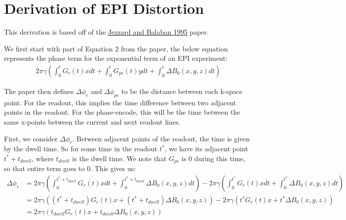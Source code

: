 \documentclass{article}
\begin{document}
\section*{Derivation of EPI Distortion}
This derivation is based off of the \href{https://pubmed.ncbi.nlm.nih.gov/7674900/}{Jezzard and Balaban 1995} paper.

We first start with part of Equation 2 from the paper, the below equation represents the phase term for the exponential
term of an EPI experiment:
\begin{align*}
    2\pi\gamma\left(\int_{0}^{t}G_r(t)x dt + \int_{0}^{t}G_{pe}(t)y dt + \int_{0}^{t}\Delta B_0(x,y,z) dt\right)
\end{align*}

The paper then defines $\Delta \phi_r$ and $\Delta \phi_{pe}$ to be the distance between each k-space point. For the
readout, this implies the time difference between two adjacent points in the readout. For the phase-encode, this will
be the time between the same x-points between the current and next readout lines.

First, we consider $\Delta \phi_r$. Between adjacent points of the readout, the time is given by the dwell time. So for
some time in the readout $t^{*}$, we have its adjacent point $t^{*} + t_{dwell}$, where $t_{dwell}$ is the dwell time. We note
that $G_{pe}$ is 0 during this time, so that entire term goes to 0. This gives us:
\begin{align*}
    \Delta \phi_r &= 2\pi\gamma\left(\int_{0}^{t^{*} + t_{dwell}}G_r(t)x dt + \int_{0}^{t^{*} + t_{dwell}}\Delta B_0(x,y,z) dt\right) -
    2\pi\gamma\left(\int_{0}^{t^{*}}G_r(t)x dt + \int_{0}^{t^{*}}\Delta B_0(x,y,z) dt\right) \\
    &= 2\pi\gamma\left((t^{*} + t_{dwell})G_r(t)x + (t^{*} + t_{dwell})\Delta B_0(x,y,z)\right) -
    2\pi\gamma\left(t^{*}G_r(t)x + t^{*}\Delta B_0(x,y,z)\right) \\
    &= 2\pi\gamma\left(t_{dwell}G_r(t)x + t_{dwell}\Delta B_0(x,y,z)\right)
\end{align*}
\end{document}
